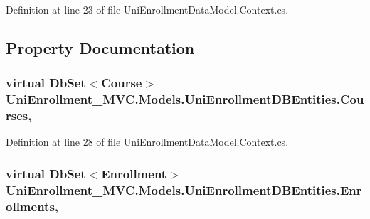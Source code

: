 Definition at line 23 of file Uni\+Enrollment\+Data\+Model.\+Context.\+cs.



\subsection{Property Documentation}
\subsubsection[{\texorpdfstring{Courses}{Courses}}]{\setlength{\rightskip}{0pt plus 5cm}virtual Db\+Set$<${\bf Course}$>$ Uni\+Enrollment\+\_\+\+M\+V\+C.\+Models.\+Uni\+Enrollment\+D\+B\+Entities.\+Courses\hspace{0.3cm}{\ttfamily [get]}, {\ttfamily [set]}}\hypertarget{class_uni_enrollment___m_v_c_1_1_models_1_1_uni_enrollment_d_b_entities_a86c01bebd8432c0e61ce61c767697781}{}\label{class_uni_enrollment___m_v_c_1_1_models_1_1_uni_enrollment_d_b_entities_a86c01bebd8432c0e61ce61c767697781}


Definition at line 28 of file Uni\+Enrollment\+Data\+Model.\+Context.\+cs.

\subsubsection[{\texorpdfstring{Enrollments}{Enrollments}}]{\setlength{\rightskip}{0pt plus 5cm}virtual Db\+Set$<${\bf Enrollment}$>$ Uni\+Enrollment\+\_\+\+M\+V\+C.\+Models.\+Uni\+Enrollment\+D\+B\+Entities.\+Enrollments\hspace{0.3cm}{\ttfamily [get]}, {\ttfamily [set]}}\hypertarget{class_uni_enrollment___m_v_c_1_1_models_1_1_uni_enrollment_d_b_entities_a7ca0bed1f5761f9a747ac39615d0e95d}{}\label{class_uni_enrollment___m_v_c_1_1_models_1_1_uni_enrollment_d_b_entities_a7ca0bed1f5761f9a747ac39615d0e95d}


